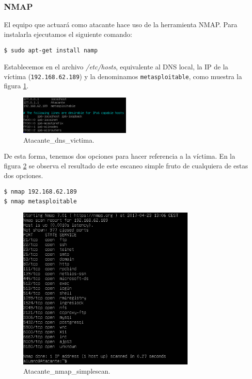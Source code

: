 \documentclass[a4,12pt,onecolum]{article}
\begin{document}
\subsubsection{NMAP}

El equipo que actuará como atacante hace uso de la herramienta NMAP. Para instalarla ejecutamos el siguiente comando:

\begin{verbatim}
$ sudo apt-get install namp
\end{verbatim}

Establecemos en el archivo \emph{/etc/hosts}, equivalente al DNS local, la IP de la víctima (\texttt{192.168.62.189}) y la denominamos \texttt{metasploitable}, como muestra la figura \ref{fig:nmap1}. \\

\begin{figure}[htbp]
\centering
\includegraphics[width=0.5\textwidth]{./images/Atacante_dns_victima.png}
\caption{Atacante\_dns\_victima.}
\label{fig:nmap1}
\end{figure}

De esta forma, tenemos dos opciones para hacer referencia a la víctima. En la figura \ref{fig:nmap2} se observa el resultado de este escaneo simple fruto de cualquiera de estas dos opciones.

\begin{verbatim}
$ nmap 192.168.62.189
$ nmap metasploitable
\end{verbatim}

\begin{figure}[htbp]
\centering
\includegraphics[width=0.8\textwidth]{./images/Atacante_nmap_simplescan.png}
\caption{Atacante\_nmap\_simplescan.}
\label{fig:nmap2}
\end{figure}
\end{document}
